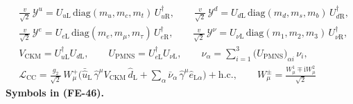 \documentclass[
  10pt,
]{article}
\begin{document}
\[
\begin{aligned}
&\frac{v}{\sqrt2}\,\mathcal{Y}^{u} = U_{u\mathrm{L}}\,\mathrm{diag}(m_u, m_c, m_t)\,U_{u\mathrm{R}}^\dagger,\qquad
 \frac{v}{\sqrt2}\,\mathcal{Y}^{d} = U_{d\mathrm{L}}\,\mathrm{diag}(m_d, m_s, m_b)\,U_{d\mathrm{R}}^\dagger,\\
&\frac{v}{\sqrt2}\,\mathcal{Y}^{e} = U_{e\mathrm{L}}\,\mathrm{diag}(m_e, m_\mu, m_\tau)\,U_{e\mathrm{R}}^\dagger,\qquad
 \frac{v}{\sqrt2}\,\mathcal{Y}^{\nu} = U_{\nu\mathrm{L}}\,\mathrm{diag}(m_1, m_2, m_3)\,U_{\nu\mathrm{R}}^\dagger,\\
&V_{\mathrm{CKM}} = U_{u\mathrm{L}}^\dagger U_{d\mathrm{L}},\qquad U_{\mathrm{PMNS}} = U_{e\mathrm{L}}^\dagger U_{\nu\mathrm{L}},\qquad
 \nu_\alpha = \sum_{i=1}^{3}\big(U_{\mathrm{PMNS}}\big)_{\alpha i}\,\nu_i,\\
&\mathcal{L}_{\mathrm{CC}} = \frac{g_2}{\sqrt2}\,W^+_\mu\Big(\bar{\hat u}_{\mathrm{L}}\,\hat\gamma^\mu V_{\mathrm{CKM}}\,\hat d_{\mathrm{L}}
 + \sum_\alpha\bar\nu_\alpha\,\hat\gamma^\mu\hat e_{\mathrm{L}\alpha}\Big) + \mathrm{h.c.},\qquad W^\pm_\mu = \frac{W^1_\mu \mp \mathrm{i}W^2_\mu}{\sqrt2}
\end{aligned} \tag{FE-46}
\] \textbf{Symbols in (FE-46).}
\end{document}
